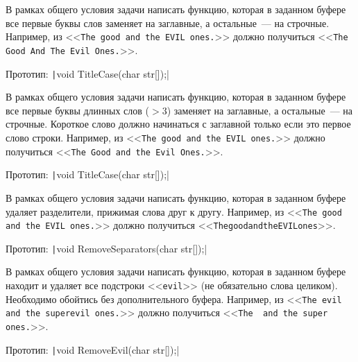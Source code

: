 \begin{zztask}
В рамках общего условия задачи написать функцию, которая в заданном буфере
все первые буквы слов заменяет на заглавные, а остальные~--- на строчные.
Например, из
<<\texttt{The good and the EVIL ones.}>>
должно получиться
<<\texttt{The Good And The Evil Ones.}>>.

Прототип: \texttt|void TitleCase(char str[]);|
\end{zztask}


\begin{zztask}[Заголовок]
В рамках общего условия задачи написать функцию, которая в заданном буфере
все первые буквы длинных слов ($>3$) заменяет на заглавные, а остальные~--- на
строчные. Короткое слово должно начинаться с заглавной только если это первое
слово строки.
Например, из
<<\texttt{The good and the EVIL ones.}>>
должно получиться
<<\texttt{The Good and the Evil Ones.}>>.

Прототип: \texttt|void TitleCase(char str[]);|
\end{zztask}


\begin{zztask}
В рамках общего условия задачи написать функцию, которая в заданном буфере
удаляет разделители, прижимая слова друг к другу.
Например, из
<<\texttt{The good and the EVIL ones.}>>
должно получиться\linebreak
<<\texttt{ThegoodandtheEVILones}>>.

Прототип: \texttt|void RemoveSeparators(char str[]);|
\end{zztask}


\begin{zztask}
В рамках общего условия задачи написать функцию, которая в заданном буфере
находит и удаляет все подстроки <<\texttt{evil}>> (не обязательно слова целиком).
Необходимо обойтись без дополнительного буфера.
Например, из
<<\texttt{The evil and the superevil ones.}>>
должно получиться
<<\texttt{The \ and the super ones.}>>.

Прототип: \texttt|void RemoveEvil(char str[]);|
\end{zztask}

